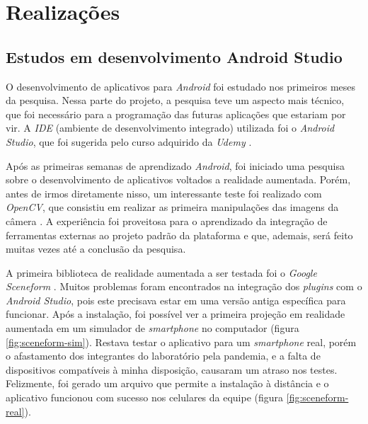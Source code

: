 \chapter{Realizações}\label{chp:realizacoes}

\section{Estudos em desenvolvimento Android Studio}

O desenvolvimento de aplicativos para \textit{Android} foi estudado nos primeiros meses da pesquisa. Nessa parte do projeto, a pesquisa teve um aspecto mais técnico, que foi necessário para a programação das futuras aplicações que estariam por vir. A \textit{IDE} (ambiente de desenvolvimento integrado) utilizada foi o \textit{Android Studio}, que foi sugerida pelo curso adquirido da \textit{Udemy} \cite{udemy}.

Após as primeiras semanas de aprendizado \textit{Android}, foi iniciado uma pesquisa sobre o desenvolvimento de aplicativos voltados a realidade aumentada. Porém, antes de irmos diretamente nisso, um interessante teste foi realizado com \textit{OpenCV},  que consistiu em realizar as primeira manipulações das imagens da câmera \cite{opencv}. A experiência foi proveitosa para o aprendizado da integração de ferramentas externas ao projeto padrão da plataforma e que, ademais, será feito muitas vezes até a conclusão da pesquisa.

A primeira biblioteca de realidade aumentada a ser testada foi o \textit{Google Sceneform} \cite{Sceneform}. Muitos problemas foram encontrados na integração dos \textit{plugins} com o \textit{Android Studio}, pois este precisava estar em uma versão antiga específica para funcionar. Após a instalação, foi possível ver a primeira projeção em realidade aumentada em um simulador de \textit{smartphone} no computador (figura \ref{fig:sceneform-sim}). Restava testar o aplicativo para um \textit{smartphone} real, porém o afastamento dos integrantes do laboratório pela pandemia, e a falta de dispositivos compatíveis à minha disposição, causaram um atraso nos testes. Felizmente, foi gerado um arquivo que permite a instalação à distância e o aplicativo funcionou com sucesso nos celulares da equipe (figura \ref{fig:sceneform-real}).

